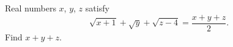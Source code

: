 Real numbers $x$, $y$, $z$ satisfy
\[
\sqrt{x+1}+\sqrt y+\sqrt{z-4}=\dfrac{x+y+z}{2}.
\]
Find $x+y+z$.
